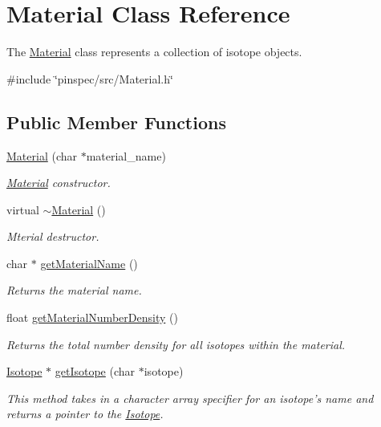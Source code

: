 \hypertarget{classMaterial}{\section{Material Class Reference}
\label{classMaterial}
}


The \hyperlink{classMaterial}{Material} class represents a collection of isotope objects.  




{\ttfamily \#include \char`\"{}pinspec/src/\-Material.\-h\char`\"{}}

\subsection*{Public Member Functions}
\begin{DoxyCompactItemize}
\item 
\hyperlink{classMaterial_a85e8dd8a94aa483bd7af567142452069}{Material} (char $\ast$material\-\_\-name)
\begin{DoxyCompactList}\small\item\em \hyperlink{classMaterial}{Material} constructor. \end{DoxyCompactList}\item 
virtual \hyperlink{classMaterial_a2c19452d71f54075df8f5405b03129f4}{$\sim$\-Material} ()
\begin{DoxyCompactList}\small\item\em Mterial destructor. \end{DoxyCompactList}\item 
char $\ast$ \hyperlink{classMaterial_ab27870f1a05a25a77c0c17959c5386b6}{get\-Material\-Name} ()
\begin{DoxyCompactList}\small\item\em Returns the material name. \end{DoxyCompactList}\item 
float \hyperlink{classMaterial_a8ec68452133cc891a57db98c66753096}{get\-Material\-Number\-Density} ()
\begin{DoxyCompactList}\small\item\em Returns the total number density for all isotopes within the material. \end{DoxyCompactList}\item 
\hyperlink{classIsotope}{Isotope} $\ast$ \hyperlink{classMaterial_ae05e89d49010885dc05648cbeb94f787}{get\-Isotope} (char $\ast$isotope)
\begin{DoxyCompactList}\small\item\em This method takes in a character array specifier for an isotope's name and returns a pointer to the \hyperlink{classIsotope}{Isotope}. \end{DoxyCompactList}\item 

\end{DoxyCompactItemize}
